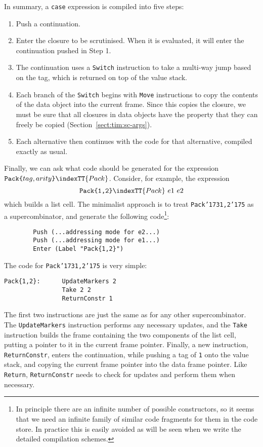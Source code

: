 In summary, a \mbox{\tt case} expression is compiled into five steps:
\begin{enumerate}
\item
Push a continuation.
\item
Enter the closure to be scrutinised.  When it is evaluated, it will
enter the continuation pushed in Step 1.
\item
The continuation uses a \mbox{\tt Switch} instruction to take a multi-way jump
based on the tag, which is returned on top of the value stack.
\item
Each branch of the \mbox{\tt Switch} begins with \mbox{\tt Move} instructions to copy the
contents of the data object into the current frame.
Since this copies the closure, we must be sure that all closures in data
objects have the property that they can freely be copied
(Section~\ref{sect:tim:sc-args}).
\item
Each alternative then continues with the code for that alternative,
compiled exactly as usual.
\end{enumerate}

Finally, we can ask what code should be generated for the expression
$\mbox{\tt Pack{\char'173}}tag,arity\mbox{\tt {\char'175}}\indexTT{Pack}$.  Consider, for example, the expression
\[
\mbox{\tt Pack{\char'173}1,2{\char'175}}\indexTT{Pack}~e1~e2
\]
which builds a list cell.  The minimalist approach is to treat \mbox{\tt Pack{\char'173}1,2{\char'175}}
as a supercombinator, and generate the following code\footnote{%
In principle there are an infinite number of possible constructors, so
it seems that we need an infinite family of similar
code fragments for them in the
code store.  In practice this is easily avoided as will be seen when we
write the detailed compilation schemes.
}:
\begin{verbatim}
        Push (...addressing mode for e2...)
        Push (...addressing mode for e1...)
        Enter (Label "Pack{1,2}")
\end{verbatim}

The code for \mbox{\tt Pack{\char'173}1,2{\char'175}} is very simple:
\begin{verbatim}
Pack{1,2}:      UpdateMarkers 2
                Take 2 2
                ReturnConstr 1
\end{verbatim}
The first two instructions are just the same as for any other supercombinator.
The \mbox{\tt UpdateMarkers} instruction performs any necessary updates, and
the \mbox{\tt Take} instruction builds the frame containing the two components of
the list cell, putting a pointer to it in the current frame pointer.
Finally, a new instruction, \mbox{\tt ReturnConstr}, enters the continuation, while
pushing
a tag of \mbox{\tt 1} onto the value stack, and copying the current frame
pointer into the data frame pointer.  Like \mbox{\tt Return}, \mbox{\tt ReturnConstr} needs to
check for updates and perform them when necessary.

